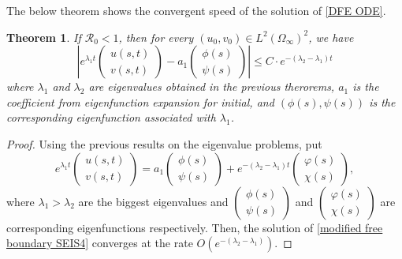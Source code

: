 \documentclass[11pt]{amsart}
\numberwithin{equation}{section}
\theoremstyle{plain}
\newtheorem{theorem}{Theorem}[section]
\theoremstyle{definition}
\begin{document}
The below theorem shows the convergent speed of the solution of \cref{DFE ODE}.
\begin{theorem}
	If $\mathcal{R}_0<1$, then for every $(u_0,v_0)\in L^2(\Omega_\infty)^2$, we have 
	\begin{equation*}
		\left| e^{\lambda_1t} \begin{pmatrix}
			u(s,t)\\
			v(s,t)
		\end{pmatrix} -a_1 \begin{pmatrix}
			\phi(s)\\
			\psi(s)
		\end{pmatrix} \right|  \leq C \cdot e^{-(\lambda_2-\lambda_1) t}
	\end{equation*}
	where $\lambda_1$ and $\lambda_2$ are eigenvalues obtained in the previous therorems, $a_1$ is the coefficient from eigenfunction expansion for initial, and $(\phi(s),
		\psi(s))$
	is the corresponding eigenfunction associated with $\lambda_1$.

\end{theorem}
\begin{proof}
	Using the previous results on the eigenvalue problems, put
	\begin{equation*}
		e^{\lambda_1t}\begin{pmatrix}
u(s,t)\\
v(s,t)	
\end{pmatrix}
=a_1\begin{pmatrix}
			\phi(s)\\
			\psi(s)
		\end{pmatrix}+e^{-(\lambda_2-\lambda_1)t}\begin{pmatrix}
			\varphi(s) \\
			\chi(s)
		\end{pmatrix},
	\end{equation*}
	where $\lambda_1>\lambda_2$ are the biggest eigenvalues and $\begin{pmatrix}
			\phi(s)\\
			\psi(s)
		\end{pmatrix}$ and $\begin{pmatrix}
			\varphi(s) \\
			\chi(s)
		\end{pmatrix}$ are corresponding eigenfunctions respectively.
	Then, the solution of \cref{modified free boundary SEIS4} converges at the rate $O(e^{-(\lambda_2-\lambda_1)})$.
\end{proof}

\nocite{Lin_2007}
\nocite{Kim_2013}
\nocite{Kim_2008}
\nocite{MENG_2013}
\nocite{Yihong_2010}
\nocite{Alaa_2013}
\nocite{Chen_2000}
\nocite{Arino_2008}
\nocite{Mimura_1985}
\nocite{Mimura_1987}
\nocite{Mimura_1986}
\nocite{Friedman_1964}
\nocite{Friedman_1982}
\end{document}
